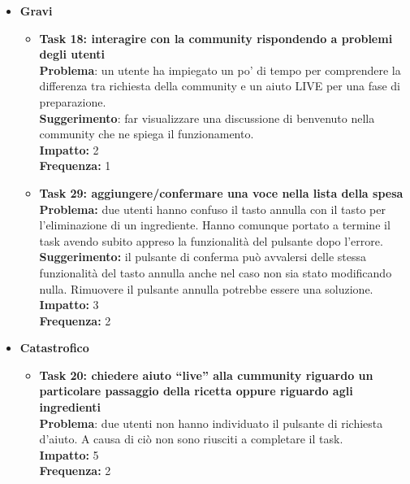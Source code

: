 \begin{itemize}
	\item \textbf{Gravi}
		\begin{itemize}
		
			\item \textbf{Task 18: interagire con la community rispondendo a problemi degli utenti}\\
				\textbf{Problema}: un utente ha impiegato un po' di tempo per comprendere la
				differenza tra richiesta della community e un aiuto LIVE per una fase di
				preparazione.\\
				\textbf{Suggerimento}: far visualizzare una discussione
				di benvenuto nella community che ne spiega il funzionamento.\\
				\textbf{Impatto:} 2\\
				\textbf{Frequenza:} 1\\
			
			\item \textbf{Task 29: aggiungere/confermare una voce nella
lista della spesa}\\
				\textbf{Problema:} due utenti hanno confuso il tasto annulla con il tasto per
				l'eliminazione di un ingrediente. Hanno comunque portato a termine il task
				avendo subito appreso la funzionalità del pulsante dopo l'errore.\\
				\textbf{Suggerimento:} il pulsante di conferma può
				avvalersi delle stessa funzionalità del tasto annulla anche nel caso non
				sia stato modificando nulla. Rimuovere il pulsante annulla potrebbe
				essere una soluzione.\\
				\textbf{Impatto:} 3\\
				\textbf{Frequenza:} 2\\
		\end{itemize}

	\item \textbf{Catastrofico}
		\begin{itemize}
			\item \textbf{Task 20: chiedere aiuto ``live'' alla cummunity riguardo un
				particolare passaggio della ricetta oppure riguardo agli ingredienti}\\
				\textbf{Problema}: due utenti non hanno individuato il pulsante di
				richiesta d'aiuto. A causa di ciò non sono riusciti a completare il
				task.\\
				\textbf{Impatto:} 5\\
				\textbf{Frequenza:} 2\\
		\end{itemize}

\end{itemize}

